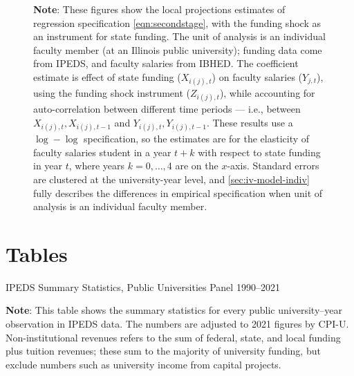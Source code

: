 \begin{figure}[H]
\begin{subfigure}[b]{0.495\textwidth}
        \label{fig:salaries-administrator-illinois-lp-rolling}
    \end{subfigure}
    \label{fig:salaries-illinois-lp-rolling}
    \justify
    \footnotesize
    \textbf{Note}:
    These figures show the local projections estimates of regression specification \eqref{eqn:secondstage}, with the funding shock as an instrument for state funding.
    The unit of analysis is an individual faculty member (at an Illinois public university); funding data come from IPEDS, and faculty salaries from IBHED.
    The coefficient estimate is effect of state funding ($X_{i(j),t}$) on faculty salaries ($Y_{j,t}$), using the funding shock instrument ($Z_{i(j),t}$), while accounting for auto-correlation between different time periods --- i.e., between $X_{i(j),t}, X_{i(j),t-1}$ and $Y_{i(j),t}, Y_{i(j),t-1}$.
    These results use a $\log-\log$ specification, so the estimates are for the elasticity of faculty salaries student in a year $t+k$ with respect to state funding in year $t$, where years $k = 0, \hdots, 4$ are on the $x$-axis. 
    Standard errors are clustered at the university-year level, and \autoref{sec:iv-model-indiv} fully describes the differences in empirical specification when unit of analysis is an individual faculty member.
\end{figure}


\newpage
\section{Tables}
\label{sec:tables}

\begin{table}[H]
    \singlespacing
    \caption{IPEDS Summary Statistics, Public Universities Panel 1990--2021}
    \makebox[\textwidth][c]{}
    \label{tab:ipeds-summary}
    \justify
    \footnotesize
    \textbf{Note}:
    This table shows the summary statistics for every public university--year observation in IPEDS data.
    The numbers are adjusted to 2021 figures by CPI-U.
    Non-institutional revenues refers to the sum of federal, state, and local funding plus tuition revenues; these sum to the majority of university funding, but exclude numbers such as university income from capital projects.
\end{table}

